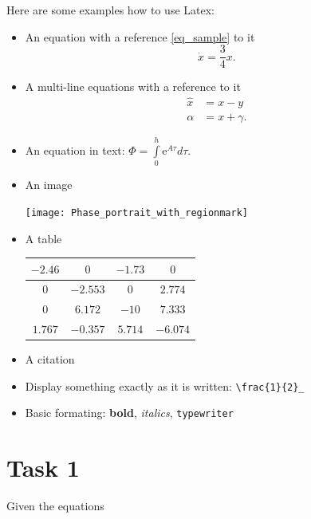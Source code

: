 \documentclass[a4paper,12pt,oneside,onecolumn]{article} %
\begin{document}
Here are some examples how to use Latex:
\begin{itemize}
 \item An equation with a reference \eqref{eq_sample} to it
 \begin{equation}
  \dot{x} = \frac{3}{4} x. \label{eq_sample}
 \end{equation}
 \item A multi-line equations with a reference to it
 \begin{align*}
  \hat{x} &= x - y\\
  \alpha &= x + \gamma.
 \end{align*}
 \item An equation in text: $\Phi = \int\limits_{0}^{h} \mathrm{e}^{A\tau} d \tau$.
 \item An image
 \begin{center}
  \texttt{[image: Phase\_portrait\_with\_regionmark]}
 \end{center}
 \item A table
 
 \begin{tabular}{@{\vrule height 10.5pt depth4pt  width0pt}|c|c|c|c|}
    \hline
     $-2.46$ & $0$ & $-1.73$ & $0$ \\ \hline
     $0$ & $-2.553$ & $0$ & $2.774$ \\ \hline
     $0$ & $6.172$ & $-10$ & $7.333$ \\ \hline
     $1.767$ & $-0.357$ & $5.714$ & $-6.074$ \\ \hline
  \end{tabular}
  \item A citation \cite{Oetiker:2008:TheNotSoShortIntroductiontoLaTeXe}
  \item Display something exactly as it is written: \verb|\frac{1}{2}_|
  \item Basic formating: \textbf{bold}, \textit{italics}, \texttt{typewriter}
\end{itemize}



\section*{Task 1}

Given the equations 
\end{document}
